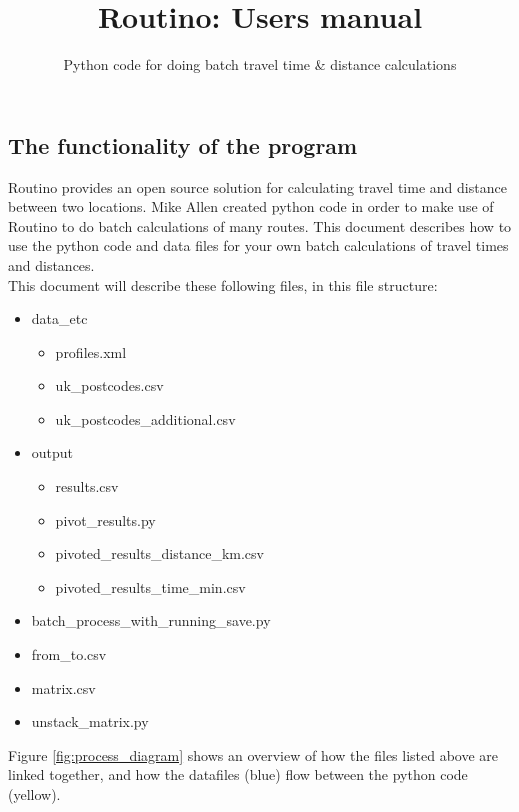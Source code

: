\documentclass{article}
\begin{document}
	
\title{Routino: Users manual}
\author{Python code for doing batch travel time \& distance calculations}

\maketitle
\begin{flushleft}
\section{The functionality of the program}
Routino provides an open source solution for calculating travel time and distance between two locations.
Mike Allen created python code in order to make use of Routino to do batch calculations of many routes. This document describes how to use the python code and data files for your own batch calculations of travel times and distances.\\
\vspace{\baselineskip}
This document will describe these following files, in this file structure:


\begin{itemize}
	\item data\_etc
	\begin{itemize}
		\item profiles.xml
		\item uk\_postcodes.csv
		\item uk\_postcodes\_additional.csv
	\end{itemize} 
	\item output
	\begin{itemize}
		\item results.csv
		\item pivot\_results.py
		\item pivoted\_results\_distance\_km.csv
		\item pivoted\_results\_time\_min.csv
	\end{itemize} 
	\item batch\_process\_with\_running\_save.py
	\item from\_to.csv
	\item matrix.csv
	\item unstack\_matrix.py
	
\end{itemize} 

Figure \ref{fig:process_diagram} shows an overview of how the files listed above are linked together, and how the datafiles (blue) flow between the python code (yellow).


\end{flushleft}
\end{document}
